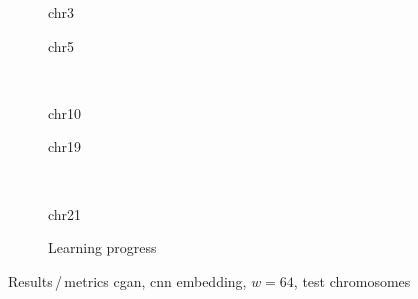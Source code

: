 \begin{figure}[p] %
    \begin{subfigure}{0.45\textwidth}
        \scriptsize
        \caption{chr3}
    \end{subfigure} \hfill
    \begin{subfigure}{0.45\textwidth}
        \scriptsize
        \caption{chr5}
    \end{subfigure}\\[5mm]
    \begin{subfigure}{0.45\textwidth}
        \scriptsize
        \caption{chr10}
    \end{subfigure}\hfill
    \begin{subfigure}{0.45\textwidth}
        \scriptsize
        \caption{chr19}
    \end{subfigure}\\[3mm]
    \begin{subfigure}{0.45\textwidth}
        \scriptsize
        \caption{chr21}
    \end{subfigure} \hfill
    \begin{subfigure}{0.45\textwidth}
        \scriptsize
        \caption{Learning progress} \label{fig:results:cGAN64_lossEpochs}
    \end{subfigure}
    \caption{Results\,/\,metrics \acrshort{cgan}, \acrshort{cnn} embedding, $w=64$, test chromosomes}   \label{fig:results:cGAN64_pearson}
\end{figure}
